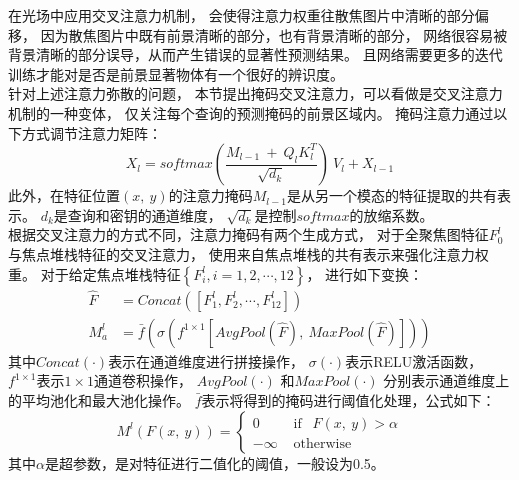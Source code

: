 在光场中应用交叉注意力机制，
会使得注意力权重往散焦图片中清晰的部分偏移，
因为散焦图片中既有前景清晰的部分，也有背景清晰的部分，
网络很容易被背景清晰的部分误导，从而产生错误的显著性预测结果。
且网络需要更多的迭代训练才能对是否是前景显著物体有一个很好的辨识度。\\
%
%
%
%
\indent 
针对上述注意力弥散的问题，
本节提出掩码交叉注意力，可以看做是交叉注意力机制的一种变体，
仅关注每个查询的预测掩码的前景区域内。
掩码注意力通过以下方式调节注意力矩阵：
%
%
\begin{equation}
X_{l}=softmax(\frac{M_{l-1} ~+~Q_{l}K_{l}^{T}}{ \sqrt{d_{k}}} )~ V_{l} + X_{l-1}
\end{equation}
%
%
%
%
%
%
% 
% 
此外，在特征位置$(x,~y)$的注意力掩码$M_{l-1}$是从另一个模态的特征提取的共有表示。
$d_{k}$是查询和密钥的通道维度，
$\sqrt{d_{k}}$是控制$softmax$的放缩系数。\\
%
%
%
%
\indent 
根据交叉注意力的方式不同，注意力掩码有两个生成方式，
对于全聚焦图特征$F_{0}^{l}$与焦点堆栈特征的交叉注意力，
使用来自焦点堆栈的共有表示来强化注意力权重。
对于给定焦点堆栈特征$\left \{ F_{i}^{l}, i=1,2,\cdots, 12 \right \}$，
进行如下变换：
%
%
%
%
\begin{equation}
\begin{aligned}
	\hat{F} &= Concat(\left [  F_{1}^{l}, F_{2}^{l}, \cdots, F_{12}^{l} \right ] ) \\
	M_{a}^{l} &= \bar{f}
	\left (  \sigma \left ( f^{1 \times 1}\left [  
	AvgPool\left ( \hat{F} \right ) ,~ MaxPool\left ( \hat{F} \right ) 
	\right ]  \right )  \right )
\end{aligned}
\end{equation}
%
%
%
其中$Concat(\cdot)$表示在通道维度进行拼接操作，
$\sigma(\cdot)$表示RELU激活函数，
$f^{1\times 1}$表示$1\times 1$通道卷积操作，
$AvgPool(\cdot)$
和$MaxPool(\cdot)$
分别表示通道维度上的平均池化和最大池化操作。
$\bar{f}$表示将得到的掩码进行阈值化处理，公式如下：
%
%
%
%
%
%
%
\begin{equation}
M^{l}\left ( F\left ( x, ~y \right )  \right ) =
\begin{cases}
	0  & \text{ if } ~~ F(x,~y)>  \alpha \\
	-\infty & \text{ otherwise } 
\end{cases}
\end{equation}
%
%
%
其中$\alpha$是超参数，是对特征进行二值化的阈值，一般设为0.5。\\
